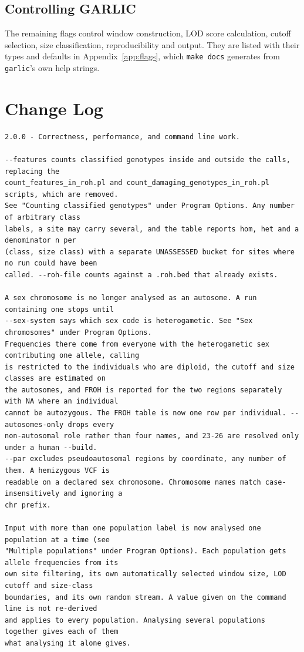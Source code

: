 \documentclass[12pt]{article}%
\begin{document}
\subsection{Controlling GARLIC}

\noindent The remaining flags control window construction, LOD score
calculation, cutoff selection, size classification, reproducibility and
output.  They are listed with their types and defaults in
Appendix~\ref{app:flags}, which {\tt make docs} generates from {\tt garlic}'s
own help strings.

\section{Change Log}
\label{sec:changelog}

\begin{lstlisting}
2.0.0 - Correctness, performance, and command line work.

--features counts classified genotypes inside and outside the calls, replacing the
count_features_in_roh.pl and count_damaging_genotypes_in_roh.pl scripts, which are removed.
See "Counting classified genotypes" under Program Options. Any number of arbitrary class
labels, a site may carry several, and the table reports hom, het and a denominator n per
(class, size class) with a separate UNASSESSED bucket for sites where no run could have been
called. --roh-file counts against a .roh.bed that already exists.

A sex chromosome is no longer analysed as an autosome. A run containing one stops until
--sex-system says which sex code is heterogametic. See "Sex chromosomes" under Program Options.
Frequencies there come from everyone with the heterogametic sex contributing one allele, calling
is restricted to the individuals who are diploid, the cutoff and size classes are estimated on
the autosomes, and FROH is reported for the two regions separately with NA where an individual
cannot be autozygous. The FROH table is now one row per individual. --autosomes-only drops every
non-autosomal role rather than four names, and 23-26 are resolved only under a human --build.
--par excludes pseudoautosomal regions by coordinate, any number of them. A hemizygous VCF is
readable on a declared sex chromosome. Chromosome names match case-insensitively and ignoring a
chr prefix.

Input with more than one population label is now analysed one population at a time (see
"Multiple populations" under Program Options). Each population gets allele frequencies from its
own site filtering, its own automatically selected window size, LOD cutoff and size-class
boundaries, and its own random stream. A value given on the command line is not re-derived
and applies to every population. Analysing several populations together gives each of them
what analysing it alone gives.


\end{lstlisting}
\end{document}
